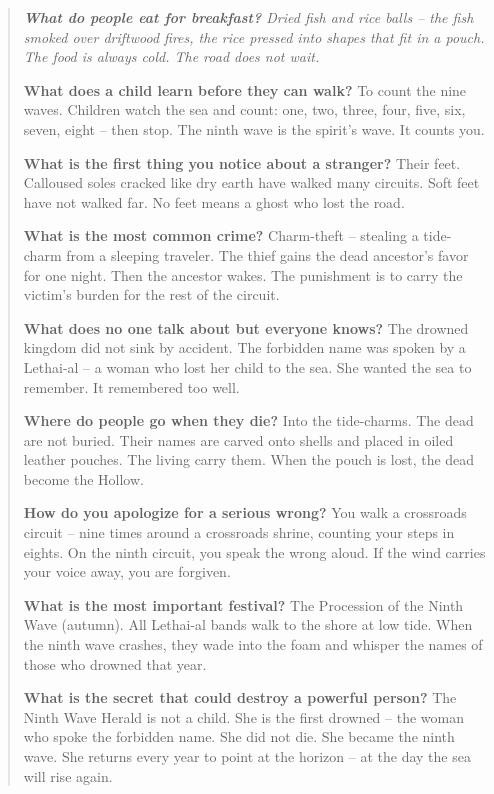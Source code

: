 \documentclass[12pt,oneside]{book}
\newenvironment{almanac}
  {\begin{quote}\small\itshape}
  {\end{quote}}
\begin{document}
\vspace{1em}
\begin{almanac}
\textbf{What do people eat for breakfast?} Dried fish and rice balls -- the fish smoked over driftwood fires, the rice pressed into shapes that fit in a pouch. The food is always cold. The road does not wait.

\textbf{What does a child learn before they can walk?} To count the nine waves. Children watch the sea and count: one, two, three, four, five, six, seven, eight -- then stop. The ninth wave is the spirit's wave. It counts you.

\textbf{What is the first thing you notice about a stranger?} Their feet. Calloused soles cracked like dry earth have walked many circuits. Soft feet have not walked far. No feet means a ghost who lost the road.

\textbf{What is the most common crime?} Charm-theft -- stealing a tide-charm from a sleeping traveler. The thief gains the dead ancestor's favor for one night. Then the ancestor wakes. The punishment is to carry the victim's burden for the rest of the circuit.

\textbf{What does no one talk about but everyone knows?} The drowned kingdom did not sink by accident. The forbidden name was spoken by a Lethai-al -- a woman who lost her child to the sea. She wanted the sea to remember. It remembered too well.

\textbf{Where do people go when they die?} Into the tide-charms. The dead are not buried. Their names are carved onto shells and placed in oiled leather pouches. The living carry them. When the pouch is lost, the dead become the Hollow.

\textbf{How do you apologize for a serious wrong?} You walk a crossroads circuit -- nine times around a crossroads shrine, counting your steps in eights. On the ninth circuit, you speak the wrong aloud. If the wind carries your voice away, you are forgiven.

\textbf{What is the most important festival?} The Procession of the Ninth Wave (autumn). All Lethai-al bands walk to the shore at low tide. When the ninth wave crashes, they wade into the foam and whisper the names of those who drowned that year.

\textbf{What is the secret that could destroy a powerful person?} The Ninth Wave Herald is not a child. She is the first drowned -- the woman who spoke the forbidden name. She did not die. She became the ninth wave. She returns every year to point at the horizon -- at the day the sea will rise again.
\end{almanac}
\end{document}
